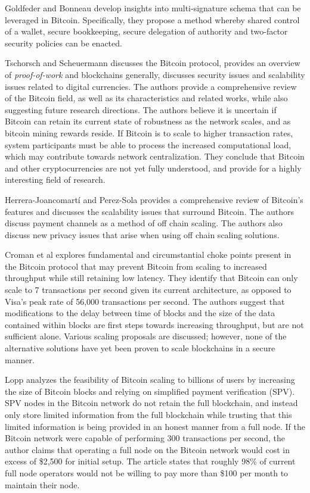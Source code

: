 \documentclass[12pt]{report}
\begin{document}
Goldfeder and Bonneau \cite{Goldfeder.2014} develop insights into multi-signature schema that can be leveraged in Bitcoin. Specifically, they propose a method whereby shared control of a wallet, secure bookkeeping, secure delegation of authority and two-factor security policies can be enacted.

Tschorsch and Scheuermann \cite{Tschorsch.2016} discusses the Bitcoin protocol, provides an overview of \textit{proof-of-work} and blockchains generally, discusses security issues and scalability issues related to digital currencies. The authors provide a comprehensive review of the Bitcoin field, as well as its characteristics and related works, while also suggesting future research directions. The authors believe it is uncertain if Bitcoin can retain its current state of robustness as the network scales, and as bitcoin mining rewards reside. If Bitcoin is to scale to higher transaction rates, system participants must be able to process the increased computational load, which may contribute towards network centralization. They conclude that Bitcoin and other cryptocurrencies are not yet fully understood, and provide for a highly interesting field of research.

Herrera-Joancomart{\'i} and Perez-Sola \cite{HerreraJoancomarti.2016} provides a comprehensive review of Bitcoin's features and discusses the scalability issues that surround Bitcoin. The authors discuss payment channels as a method of off chain scaling. The authors also discuss new privacy issues that arise when using off chain scaling solutions.

Croman et al \cite{Croman.2016} explores fundamental and circumstantial choke points present in the Bitcoin protocol that may prevent Bitcoin from scaling to increased throughput while still retaining low latency. They identify that Bitcoin can only scale to 7 transactions per second given its current architecture, as opposed to Visa's peak rate of 56,000 transactions per second. The authors suggest that modifications to the delay between time of blocks and the size of the data contained within blocks are first steps towards increasing throughput, but are not sufficient alone. Various scaling proposals are discussed; however, none of the alternative solutions have yet been proven to scale blockchains in a secure manner.

Lopp \cite{JamesonLopp.20170730} analyzes the feasibility of Bitcoin scaling to billions of users by increasing the size of Bitcoin blocks and relying on simplified payment verification (SPV). SPV nodes in the Bitcoin network do not retain the full blockchain, and instead only store limited information from the full blockchain while trusting that this limited information is being provided in an honest manner from a full node. If the Bitcoin network were capable of performing 300 transactions per second, the author claims that operating a full node on the Bitcoin network would cost in excess of \$2,500 for initial setup. The article states that roughly 98\% of current full node operators would not be willing to pay more than \$100 per month to maintain their node.
\end{document}
